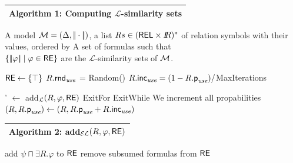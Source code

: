 \begin{multicols}{2}

\begin{tabular}{p{.95\linewidth}}\hline
\small \textbf{Algorithm 1:} Computing $\mathcal{L}$-similarity sets\\ \hline
\end{tabular}

\begin{algorithmic}
\small 

\Require A model $\mathcal{M} = (\Delta, |\!|\cdot|\!|)$, a list $Rs \in (\textsf{REL} \times I\!\!R)^*$
 of relation symbols with their \puse values, ordered by \puse
\Ensure A set of formulas \RE such that \\ $\{|\!|\varphi|\!| \mid \varphi \in \textsf{RE}\}$ are the
$\mathcal{L}$-similarity sets of $\mathcal{M}$.

\State
\State $\textsf{RE} \leftarrow \{\top\}$
  \State $R.\textsf{rnd}_\emph{use}$ = Random()
  \State $R.\textsf{inc}_\emph{use} = (1-R.\textsf{p}_\emph{use})/$MaxIterations
\EndFor

    \State    \RE' $\leftarrow$ \RE 
          \For{$\varphi \in \RE$}
              \State add$_\mathcal{L}(R, \varphi, \textsf{RE})$
                 \State ExitFor
             \EndIf
          \EndFor
       \EndIf
     \EndFor
        \State ExitWhile
     \EndIf
  \EndWhile
  \Comment We increment all propabilities
    \State $(R,R.\textsf{p}_\emph{use}) \leftarrow (R, R.\textsf{p}_\emph{use} + R.\textsf{inc}_\emph{use})$
  \EndFor
\EndWhile
\end{algorithmic}

\begin{tabular}{p{.95\linewidth}}\hline
\small \textbf{Algorithm 2:} add$_{\mathcal{EL}}(R,\varphi,\textsf{RE})$\\ \hline
\end{tabular}

\begin{algorithmic}
      \State add $\psi \sqcap \exists R.\varphi$ to $\textsf{RE}$
      \State remove subsumed formulas from $\textsf{RE}$
  \EndIf
\EndFor
\end{algorithmic}
\end{multicols}

